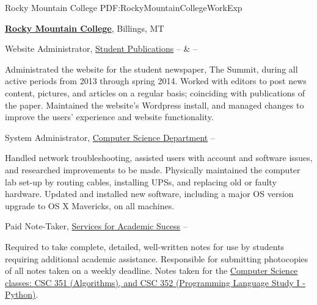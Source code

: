 \documentclass[letterpaper,MMMyyyy,nonstopmode]{simpleresumecv}
\begin{document}
\begin{Body}
\SubSection
{}
{Rocky Mountain College}
{PDF:RockyMountainCollegeWorkExp}

\Entry
\href{http://www.rocky.edu}
{\textbf{Rocky Mountain College}},
Billings, MT

\Gap
\BulletItem
Website Administrator,
\href{http://summit.rocky.edu}
{Student Publications}
\hfill
{} --
 \&
 --
\begin{Detail}
\SubBulletItem
Administrated the website for the student newspaper, The Summit, during all active periods from 2013 through spring 2014.
\SubBulletItem
Worked with editors to post news content, pictures, and articles on a regular basis; coinciding with publications of the paper.
\SubBulletItem
Maintained the website's Wordpress install, and managed changes to improve the users' experience and website functionality.
\end{Detail}

\Gap
\BulletItem
System Administrator,
\href{http://cs.rocky.edu}
{Computer Science Department}
\hfill
{} --
\begin{Detail}
\SubBulletItem
Handled network troubleshooting, assisted users with account and software issues, and researched improvements to be made.
\SubBulletItem
Physically maintained the computer lab set-up by routing cables, installing UPSs, and replacing old or faulty hardware.
\SubBulletItem
Updated and installed new software, including a major OS version upgrade to OS X Mavericks, on all machines.
\end{Detail}

\Gap
\BulletItem
Paid Note-Taker,
\href{https://www.rocky.edu/student-life/student-support/academic-support/ServicesAcademicSuccess.php}
{Services for Academic Sucess}
\hfill
{} --
\begin{Detail}
\SubBulletItem
Required to take complete, detailed, well-written notes for use by students requiring additional academic assistance.
\SubBulletItem
Responsible for submitting photocopies of all notes taken on a weekly deadline.
\SubBulletItem
Notes taken for the \href{https://www.rocky.edu/academics/catalog/program/9/Computer_Science#courses-content}{Computer Science classes: CSC 351 (Algorithms), and CSC 352 (Programming Language Study I - Python)}.
\end{Detail}


\end{Body}
\end{document}
